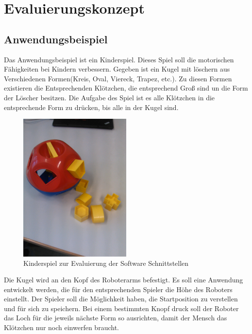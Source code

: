 \chapter{Evaluierungskonzept}
\label{konzept_kon}

\section{Anwendungsbeispiel}
\label{sec:anwendung_kon}

Das Anwendungsbeispiel ist ein Kinderspiel. Dieses Spiel soll die motorischen Fähigkeiten bei Kindern verbessern.
Gegeben ist ein Kugel mit löschern aus Verschiedenen Formen(Kreis, Oval, Viereck, Trapez, etc.). Zu diesen Formen existieren die Entsprechenden Klötzchen, die entsprechend Groß sind un die Form der Löscher besitzen. Die Aufgabe des Spiel ist es alle Klötzchen in die entsprechende Form zu drücken, bis alle in der Kugel sind.

\begin{figure}[H]
  \centering
    \includegraphics[width=0.5\textwidth]{pic/spiel.jpg}
      \caption[Kinder Geschicklichkeitsspiel]{Kinderspiel zur Evaluierung der Software Schnittstellen}
      \label{fig:kinderspiel}
\end{figure}
\newpage
Die Kugel wird an den Kopf des Roboterarms befestigt. Es soll eine Anwendung entwickelt werden, die für den entsprechenden Spieler die Höhe des Roboters einstellt. Der Spieler soll die Möglichkeit haben, die Startposition zu verstellen und für sich zu speichern. Bei einem bestimmten Knopf druck soll der Roboter das Loch für die jeweils nächste Form so ausrichten, damit der Mensch das Klötzchen nur noch einwerfen braucht.

